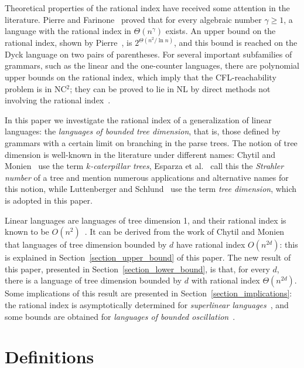 \documentclass[runningheads]{llncs}
\begin{document}
Theoretical properties of the rational index
have received some attention in the literature.
Pierre and Farinone~\cite{GreibRat} proved that for every algebraic number $\gamma \geqslant 1$,
a language with the rational index in $\Theta(n^\gamma)$ exists.
An upper bound on the rational index,
shown by Pierre~\cite{CFRat}, is $2^{\Theta(n^2/\ln n)}$,
and this bound is reached on the Dyck language on two pairs of parentheses.
For several important subfamilies of grammars,
such as the linear and the one-counter languages,
there are polynomial upper bounds on the rational index,
which imply that the CFL-reachability problem is in NC$^2$;
they can be proved to lie in NL
by direct methods not involving the rational index~\cite{labelledGraphs,LReach}.

In this paper we investigate the rational index of a generalization of linear languages:
the \emph{languages of bounded tree dimension},
that is, those defined by grammars
with a certain limit on branching in the parse trees.
The notion of tree dimension is well-known in the literature under different names:
Chytil and Monien~\cite{ChytilMonien} use the term \emph{$k$-caterpillar trees},
Esparza et al.~\cite{EsparzaLuttenbergerSchlund} call this the \emph{Strahler number} of a tree
and mention numerous applications and alternative names for this notion,
while Luttenberger and Schlund~\cite{LuttenbergerSchlund} use the term \emph{tree dimension},
which is adopted in this paper.

Linear languages are languages of tree dimension 1,
and their rational index is known to be $O(n^2)$~\cite{RatBasic}.
It can be derived from the work of Chytil and Monien~\cite{ChytilMonien}
that languages of tree dimension bounded by $d$
have rational index $O(n^{2d})$:
this is explained in Section~\ref{section_upper_bound} of this paper.
The new result of this paper, presented in Section~\ref{section_lower_bound},
is that, for every $d$, there is a language of tree dimension bounded by $d$
with rational index $\Theta(n^{2d})$.
Some implications of this result
are presented in Section~\ref{section_implications}:
the rational index is asymptotically determined for \emph{superlinear languages}~\cite{superlinear},
and some bounds are obtained for \emph{languages of bounded oscillation}~\cite{BoundOsc,Wechsung}.







\section{Definitions}\label{section_definitions}
\end{document}
